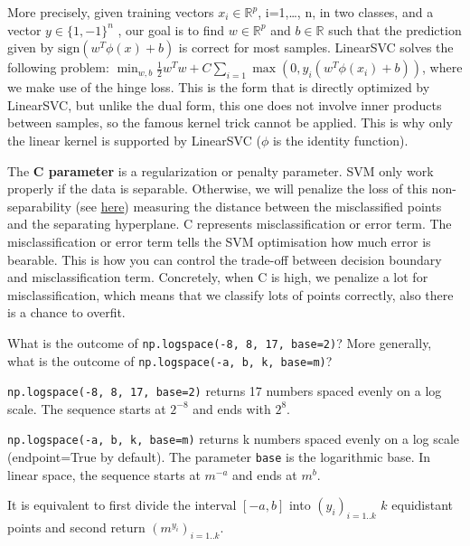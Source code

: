 \documentclass[10pt,a4paper]{article}
\theoremstyle{break}
\begin{document}
More precisely, given training vectors \(x_i \in \mathbb{R}^p\), i=1,\ldots{}, n, in two classes, and a vector \(y \in \{1, -1\}^n\)
, our goal is to find \(w \in \mathbb{R}^p\) and \(b \in \mathbb{R}\) such that the prediction given by \(\text{sign} (w^T\phi(x) + b)\) is correct for most samples.
LinearSVC solves the following problem:
\(\min_ {w, b} \frac{1}{2} w^T w + C \sum_{i=1}\max(0, y_i (w^T \phi(x_i) + b))\),
where we make use of the hinge loss. This is the form that is directly optimized by LinearSVC, but unlike the dual form, this one does not involve inner products between samples, so the famous kernel trick cannot be applied. This is why only the linear kernel is supported by LinearSVC (\(\phi\) is the identity function).

The \textbf{C parameter} is a regularization or penalty parameter. SVM only work properly if the data is separable. Otherwise, we will penalize the loss of this non-separability (see \href{https://scikit-learn.org/stable/modules/svm.html\#svc}{here}) measuring the distance between the misclassified points and the separating hyperplane. C represents misclassification or error term. The misclassification or error term tells the SVM optimisation how much error is bearable. This is how you can control the trade-off between decision boundary and misclassification term. Concretely, when C is high, we penalize a lot for misclassification, which means that we classify lots of points correctly, also there is a chance to overfit.

\begin{tcolorbox}

What is the outcome of \texttt{np.logspace(-8,\ 8,\ 17,\ base=2)}? More generally, what is the outcome of \texttt{np.logspace(-a,\ b,\ k,\ base=m)}?

\end{tcolorbox}

\texttt{np.logspace(-8,\ 8,\ 17,\ base=2)} returns 17 numbers spaced evenly on a log scale. The sequence starts at \(2^{-8}\) and ends with \(2^{8}\).

\texttt{np.logspace(-a,\ b,\ k,\ base=m)} returns k numbers spaced evenly on a log scale (endpoint=True by default). The parameter \texttt{base} is the logarithmic base. In linear space, the sequence starts at \(m^{-a}\) and ends at \(m^b\).

It is equivalent to first divide the interval \([-a,b]\) into \((y_i)_{i=1..k}\) \(k\) equidistant points and second return \(\left(m^{y_i}\right)_{i=1..k}\).
\end{document}
